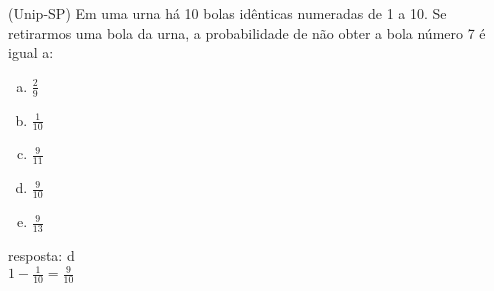 \begin{ex}
(Unip-SP) Em uma urna há 10 bolas idênticas numeradas de 1 a 10. Se retirarmos uma bola da urna, a probabilidade de não obter a bola número 7 é igual a:
   \begin{enumerate}[(a)]
   \item $\frac{2}{9}$
   \item $\frac{1}{10}$
   \item $\frac{9}{11}$
   \item $\frac{9}{10}$
   \item $\frac{9}{13}$
   \end{enumerate}
     \begin{sol}
       resposta: d \\
       $1-\frac{1}{10}=\frac{9}{10}$
     \end{sol}
\end{ex}